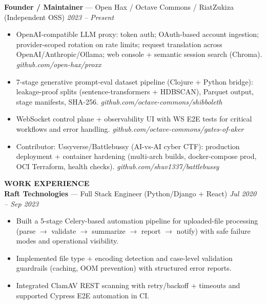 \documentclass[10pt]{article}
\begin{document}
\textbf{Founder / Maintainer} --- Open Hax / Octave Commons / RiatZukiza (Independent OSS) \hfill \textit{2023 -- Present}\\
\vspace{-6pt}
\begin{itemize}
  \setlength\itemsep{-2pt}
  \setlength\parskip{0pt}
  \setlength\parsep{0pt}
  \item OpenAI-compatible LLM proxy: token auth; OAuth-based account ingestion; provider-scoped rotation on rate limits; request translation across OpenAI/Anthropic/Ollama; web console + semantic session search (Chroma). \textit{github.com/open-hax/proxx}
  \item 7-stage generative prompt-eval dataset pipeline (Clojure + Python bridge): leakage-proof splits (sentence-transformers + HDBSCAN), Parquet output, stage manifests, SHA-256. \textit{github.com/octave-commons/shibboleth}
  \item WebSocket control plane + observability UI with WS E2E tests for critical workflows and error handling. \textit{github.com/octave-commons/gates-of-aker}
  \item Contributor: Ussyverse/Battlebussy (AI-vs-AI cyber CTF): production deployment + container hardening (multi-arch builds, docker-compose prod, OCI Terraform, health checks). \textit{github.com/shuv1337/battlebussy}
\end{itemize}

\vspace{6pt}
\textbf{WORK EXPERIENCE}\\

\textbf{Raft Technologies} --- Full Stack Engineer (Python/Django + React) \hfill \textit{Jul 2020 -- Sep 2023}\\
\vspace{-6pt}
\begin{itemize}
  \setlength\itemsep{-2pt}
  \setlength\parskip{0pt}
  \setlength\parsep{0pt}
  \item Built a 5-stage Celery-based automation pipeline for uploaded-file processing (parse $\rightarrow$ validate $\rightarrow$ summarize $\rightarrow$ report $\rightarrow$ notify) with safe failure modes and operational visibility.
  \item Implemented file type + encoding detection and case-level validation guardrails (caching, OOM prevention) with structured error reports.
  \item Integrated ClamAV REST scanning with retry/backoff + timeouts and supported Cypress E2E automation in CI.
\end{itemize}
\end{document}
